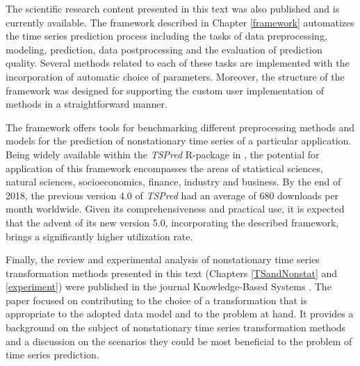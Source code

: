 \documentclass[11pt]{dippg}
\begin{document}
The scientific research content presented in this text was also published and is currently available. The framework described in Chapter \ref{framework} automatizes the time series prediction process including the tasks of data preprocessing, modeling, prediction, data postprocessing and the evaluation of prediction quality. Several methods related to each of these tasks are implemented with the incorporation of automatic choice of parameters. Moreover, the structure of the framework was designed for supporting the custom user implementation of methods in a straightforward manner.

The framework offers tools for benchmarking different preprocessing methods and models for the prediction of nonstationary time series of a particular application. Being widely available within the \emph{TSPred} R-package \cite{salles_tspred:_2018} in , the potential for application of this framework encompasses the areas of statistical sciences, natural sciences, socioeconomics, finance, industry and business. By the end of 2018, the previous version 4.0 of \emph{TSPred} had an average of $680$ downloads per month worldwide. Given its comprehensiveness and practical use, it is expected that the advent of its new version 5.0, incorporating the described framework, brings a significantly higher utilization rate.

Finally, the review and experimental analysis of nonstationary time series transformation methods presented in this text (Chapters \ref{TSandNonstat} and \ref{experiment}) were published in the journal Knowledge-Based Systems \cite{salles_nonstationary_2019}. The paper focused on contributing to the choice of a transformation that is appropriate to the adopted data model and to the problem at hand. It provides a background on the subject of nonstationary time series transformation methods and a discussion on the scenarios they could be most beneficial to the problem of time series prediction.


\printbibliography
\end{document}
